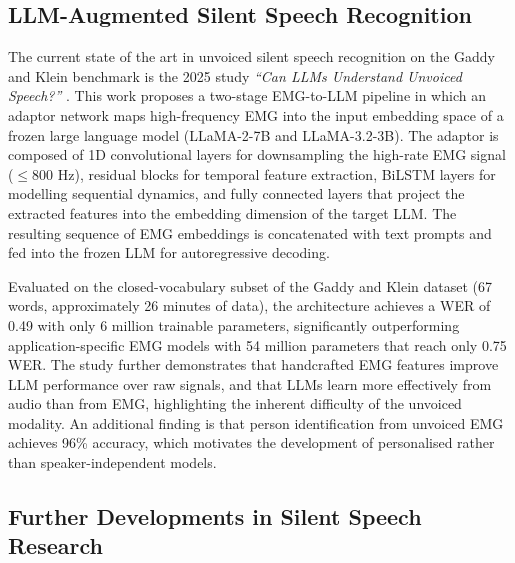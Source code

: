 \subsection{LLM-Augmented Silent Speech Recognition}

The current state of the art in unvoiced silent speech recognition on the Gaddy and Klein benchmark is the 2025 study \textit{``Can LLMs Understand Unvoiced Speech?''} \citep{mohapatra2025}. This work proposes a two-stage EMG-to-LLM pipeline in which an adaptor network maps high-frequency EMG into the input embedding space of a frozen large language model (LLaMA-2-7B and LLaMA-3.2-3B). The adaptor is composed of 1D convolutional layers for downsampling the high-rate EMG signal ($\leq$800 Hz), residual blocks for temporal feature extraction, BiLSTM layers for modelling sequential dynamics, and fully connected layers that project the extracted features into the embedding dimension of the target LLM. The resulting sequence of EMG embeddings is concatenated with text prompts and fed into the frozen LLM for autoregressive decoding.

Evaluated on the closed-vocabulary subset of the Gaddy and Klein dataset (67 words, approximately 26 minutes of data), the architecture achieves a WER of 0.49 with only 6 million trainable parameters, significantly outperforming application-specific EMG models with 54 million parameters that reach only 0.75 WER. The study further demonstrates that handcrafted EMG features improve LLM performance over raw signals, and that LLMs learn more effectively from audio than from EMG, highlighting the inherent difficulty of the unvoiced modality. An additional finding is that person identification from unvoiced EMG achieves 96\% accuracy, which motivates the development of personalised rather than speaker-independent models.

\subsection{Further Developments in Silent Speech Research}

